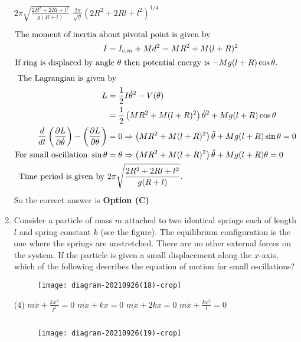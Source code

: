 \begin{enumerate}
\begin{tasks}
\task[\textbf{C.}] $2 \pi \sqrt{\frac{2 R^{2}+2 R l+l^{2}}{g(R+l)}}$
\task[\textbf{D.}] $\frac{2 \pi}{\sqrt{g}}\left(2 R^{2}+2 R l+l^{2}\right)^{1 / 4}$
\end{tasks}
\begin{answer}
\begin{align*}
\intertext{The moment of inertia about pivotal point is given by}
I&=I_{c, m}+M d^{2}=M R^{2}+M(l+R)^{2}\\
\intertext{If ring is displaced by angle $\theta$ then potential energy is $-M g(l+R) \cos \theta$.}
\intertext{ The Lagrangian is given by}
L&=\frac{1}{2} I \dot{\theta}^{2}-V(\theta)\\&=\frac{1}{2}\left(M R^{2}+M(l+R)^{2}\right) \dot{\theta}^{2}+M g(l+R) \cos \theta\\
\frac{d}{d t}\left(\frac{\partial L}{\partial \dot{\theta}}\right)-\left(\frac{\partial L}{\partial \theta}\right)&=0 \Rightarrow\left(M R^{2}+M(l+R)^{2}\right) \ddot{\theta}+M g(l+R) \sin \theta=0\\
\text{For small oscillation }\sin \theta&=\theta \Rightarrow\left(M R^{2}+M(l+R)^{2}\right) \ddot{\theta}+M g(l+R) \theta=0\\
\text{Time period is given by }&2 \pi \sqrt{\frac{2 R^{2}+2 R l+l^{2}}{g(R+l)}}.
\end{align*}
So the correct answer is \textbf{Option (C)}
\end{answer}	
\item Consider a particle of mass $m$ attached to two identical springs each of length $l$ and spring constant $k$ (see the figure). The equilibrium configuration is the one where the springs are unstretched. There are no other external forces on the system. If the particle is given a small displacement along the $x$-axis, which of the following describes the equation of motion for small oscillations?
{}
\begin{figure}[H]
\centering
\texttt{[image: diagram-20210926(18)-crop]}
\end{figure}
\begin{tasks}(4)
\task[\textbf{A.}] $m \ddot{x}+\frac{k x^{3}}{l^{2}}=0$
\task[\textbf{B.}]  $m \ddot{x}+k x=0$
\task[\textbf{C.}] $m \ddot{x}+2 k x=0$
\task[\textbf{D.}] $m \ddot{x}+\frac{k x^{2}}{l}=0$
\end{tasks}
\begin{answer}$\left. \right. $
\begin{figure}[H]
	\centering
	\texttt{[image: diagram-20210926(19)-crop]}

\end{figure}
\end{answer}
\end{enumerate}
